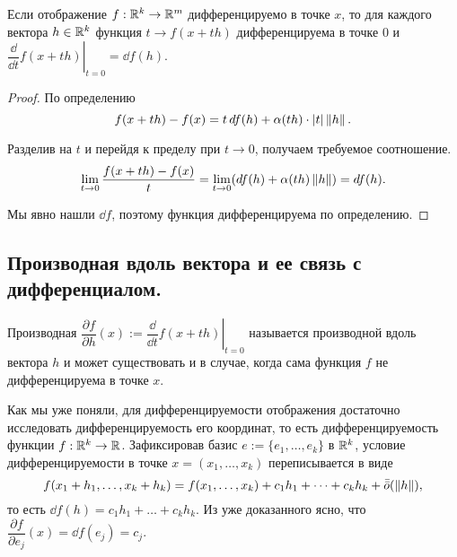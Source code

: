 \documentclass[a4paper]{article}
\theoremstyle{named}
\begin{document}
    \begin{lemma*}
        Если отображение $f: \mathbb{R}^k \to \mathbb{R}^m$ дифференцируемо в точке $x$, то для каждого вектора $h \in \mathbb{R}^k$ функция $t \to f(x + th)$ дифференцируема в точке $0$ и $\left.\dfrac{\dd}{\dd t}f(x + th)\right|_{t = 0} = \dd f(h)$.
    \end{lemma*}

    \begin{proof}
        По определению 
        \begin{equation*}
            f(x + th) - f(x) = t \mathop{}\!d f(h) + \alpha(th) \cdot |t| \left\lVert h\right\rVert.
        \end{equation*}

        Разделив на $t$ и перейдя к пределу при $t \to 0$, получаем требуемое соотношение.
        \begin{equation*}
            \lim_{t \to 0} \dfrac{f(x + th) - f(x)}{t} = \lim_{t \to 0} (\mathop{}\!d f(h) + \alpha(th) \left\lVert h\right\rVert) = \mathop{}\!d f(h).
        \end{equation*}

        Мы явно нашли $\dd f$, поэтому функция дифференцируема по определению.
    \end{proof}

    \subsection{Производная вдоль вектора и ее связь с дифференциалом.}

    \begin{definition*}
        Производная $\dfrac{\partial f}{\partial h}(x) := \left.\dfrac{\dd}{\dd t}f(x + th)\right|_{t = 0}$ называется производной вдоль вектора $h$ и может существовать и в случае, когда сама функция $f$ не дифференцируема в точке $x$.
    \end{definition*}

    Как мы уже поняли, для дифференцируемости отображения достаточно исследовать дифференцируемость его координат, то есть дифференцируемость функции $f: \mathbb{R}^k \to \mathbb{R}$. Зафиксировав базис $e := \{e_1, \dots, e_k\}$ в $\mathbb{R}^k$, условие дифференцируемости в точке $x = (x_1, \dots, x_k)$ переписывается в виде
    \begin{equation*}
        f(x_1 + h_1, \dots, x_k + h_k) = f(x_1, \dots, x_k) + c_1h_1 + \dots + c_k h_k + \bar{\bar{o}}(\left\lVert h\right\rVert),
    \end{equation*}
    то есть $\dd f(h) = c_1h_1 + \dots + c_kh_k$. Из уже доказанного ясно, что $\dfrac{\partial f}{\partial e_j}(x) = \dd f(e_j) = c_j$.
\end{document}
